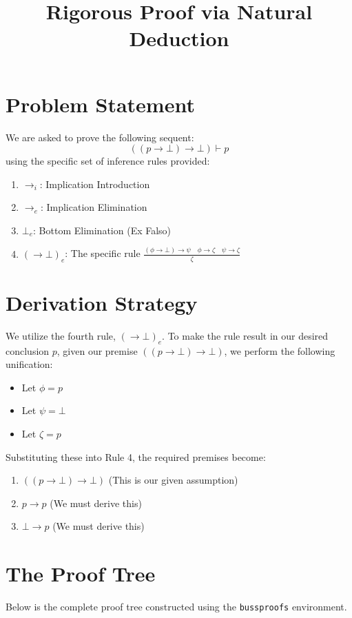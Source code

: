 \documentclass[a4paper,12pt]{article}
\title{\textbf{Rigorous Proof via Natural Deduction}}
\author{}
\date{}
\begin{document}
\maketitle

\section*{Problem Statement}
We are asked to prove the following sequent:
$$ ((p \to \bot) \to \bot) \vdash p $$
using the specific set of inference rules provided:
\begin{enumerate}
    \item $\to_i$: Implication Introduction
    \item $\to_e$: Implication Elimination
    \item $\bot_e$: Bottom Elimination (Ex Falso)
    \item $(\to \bot)_e$: The specific rule $\frac{(\phi \to \bot) \to \psi \quad \phi \to \zeta \quad \psi \to \zeta}{\zeta}$
\end{enumerate}

\section*{Derivation Strategy}
We utilize the fourth rule, $(\to \bot)_e$. To make the rule result in our desired conclusion $p$, given our premise $((p \to \bot) \to \bot)$, we perform the following unification:
\begin{itemize}
    \item Let $\phi = p$
    \item Let $\psi = \bot$
    \item Let $\zeta = p$
\end{itemize}

Substituting these into Rule 4, the required premises become:
\begin{enumerate}
    \item $((p \to \bot) \to \bot)$ (This is our given assumption)
    \item $p \to p$ (We must derive this)
    \item $\bot \to p$ (We must derive this)
\end{enumerate}

\section*{The Proof Tree}
Below is the complete proof tree constructed using the \texttt{bussproofs} environment.
\end{document}
